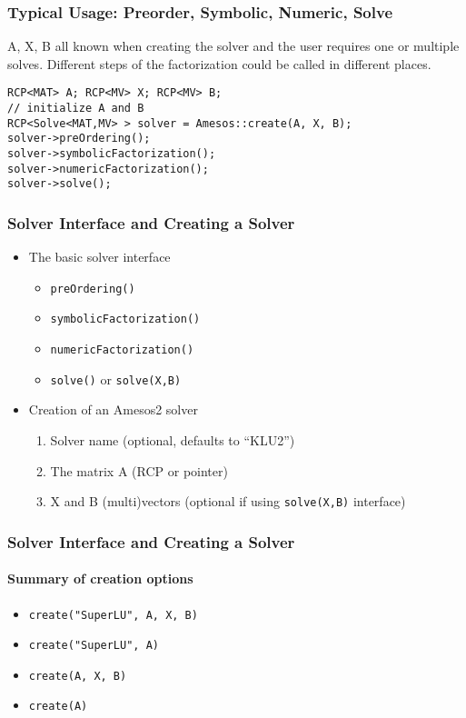 \documentclass[xcolor=dvipsnames]{beamer}
\begin{document}
\begin{frame}[fragile]
  \frametitle{Typical Usage: Preorder, Symbolic, Numeric, Solve}
  A, X, B all known when creating the solver and the user requires one or
  multiple solves. Different steps of the factorization could be called in
  different places.
  \begin{lstlisting}
RCP<MAT> A; RCP<MV> X; RCP<MV> B;
// initialize A and B
RCP<Solve<MAT,MV> > solver = Amesos::create(A, X, B);
solver->preOrdering();
solver->symbolicFactorization();
solver->numericFactorization();
solver->solve();
  \end{lstlisting}
\end{frame}

\begin{frame}
  \frametitle{Solver Interface and Creating a Solver}
  \begin{itemize}
  \item The basic solver interface
    \begin{itemize}
    \item \texttt{preOrdering()}
    \item \texttt{symbolicFactorization()}
    \item \texttt{numericFactorization()}
    \item \texttt{solve()} or \texttt{solve(X,B)}
    \end{itemize}
  \item Creation of an Amesos2 solver
    \begin{enumerate}
    \item Solver name (optional, defaults to ``KLU2'')
    \item The matrix A (RCP or pointer)
    \item X and B (multi)vectors (optional if using \texttt{solve(X,B)} interface)
    \end{enumerate}
  \end{itemize}
\end{frame}

\begin{frame}
  \frametitle{Solver Interface and Creating a Solver}
  \framesubtitle{Summary of creation options}
  \begin{itemize}
  \item \texttt{create("SuperLU", A, X, B)}
  \item \texttt{create("SuperLU", A)}
  \item \texttt{create(A, X, B)}
  \item \texttt{create(A)}
  \end{itemize}
\end{frame}
\end{document}

